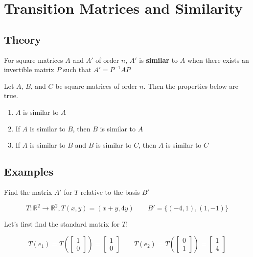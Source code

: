 \documentclass{report}
\begin{document}
\section{Transition Matrices and Similarity}

\subsection{Theory}

\begin{tcolorbox}[title = Definition of Similar Matrices]
	For square matrices $A$ and $A'$ of order $n$, $A'$ is \textbf{similar} to $A$ when there exists an invertible matrix $P$ such that $A' = P^{-1} AP$
\end{tcolorbox}

\begin{tcolorbox}[title = Properites of Similar Matrices]
	Let $A$, $B$, and $C$ be square matrices of order $n$. Then the properties below are true.
	
	\begin{enumerate}
		\item $A$ is similar to $A$
		\item If $A$ is similar to $B$, then $B$ is similar to $A$
		\item If $A$ is similar to $B$ and $B$ is similar to $C$, then $A$ is similar to $C$
	\end{enumerate}
\end{tcolorbox}

\subsection{Examples}

\begin{tcolorbox}[colframe = lightred]
	Find the matrix $A'$ for $T$ relative to the basis $B'$
	
	$$
	T: \mathbb{R}^2 \to \mathbb{R}^2, T(x,y) = (x+y, 4y) \quad \quad B' = \{ (-4,1),(1,-1)\}
	$$
\end{tcolorbox}

\noindent Let's first find the standard matrix for $T$:

$$
T(e_1)  = T \left( \begin{bmatrix} 1 \\ 0 \end{bmatrix} \right) = \begin{bmatrix} 1 \\ 0 \end{bmatrix} \quad \quad T(e_2) = T \left( \begin{bmatrix} 0 \\ 1 \end{bmatrix} \right) = \begin{bmatrix} 1 \\ 4 \end{bmatrix} 
$$
\end{document}
